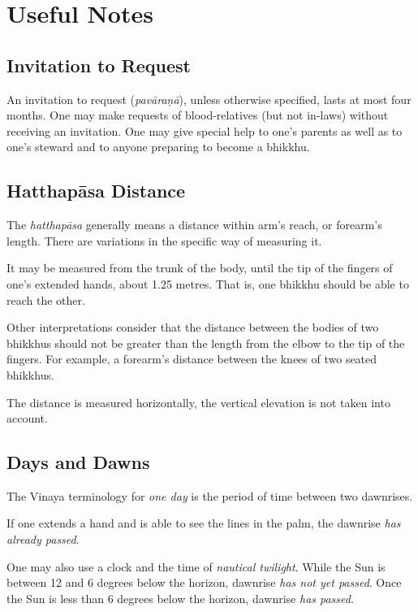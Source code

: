 \chapter{Useful Notes}

\vspace*{-2\baselineskip}

\section*{Invitation to Request}

An invitation to request (\emph{pavāraṇā}), unless otherwise specified, lasts at
most four months. One may make requests of blood-relatives (but not in-laws)
without receiving an invitation. One may give special help to one's parents as
well as to one's steward and to anyone preparing to become a bhikkhu.\\

\section*{Hatthapāsa Distance}

The \emph{hatthapāsa} generally means a distance within arm's reach, or
forearm's length. There are variations in the specific way of measuring it.

It may be measured from the trunk of the body, until the tip of the fingers of
one's extended hands, about 1.25 metres. That is, one bhikkhu should be able to
reach the other.

Other interpretations consider that the distance between the bodies of two
bhikkhus should not be greater than the length from the elbow to the tip of the
fingers. For example, a forearm's distance between the knees of two seated
bhikkhus.

The distance is measured horizontally, the vertical elevation is not taken into
account.

\section*{Days and Dawns}

The Vinaya terminology for \emph{one day} is the period of time between two
dawnrises.

If one extends a hand and is able to see the lines in the palm, the dawnrise
\emph{has already passed}.

One may also use a clock and the time of \emph{nautical twilight}. While the Sun
is between 12 and 6 degrees below the horizon, dawnrise \emph{has not yet
  passed}. Once the Sun is less than 6 degrees below the horizon, dawnrise
\emph{has passed}.

